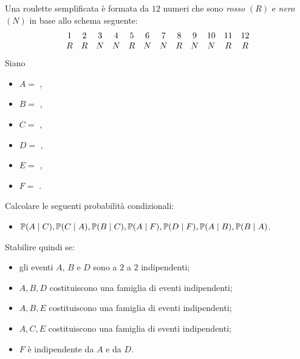 Una roulette semplificata è formata da $12$ numeri che sono \emph{rosso} $(R)$ e \emph{nero} $(N)$ in base allo schema seguente:
\begin{equation*}
	\begin{array}{ c c c c c c c c c c c c }
		1 & 2 & 3 & 4 & 5 & 6 & 7 & 8 & 9 & 10 & 11 & 12\\
		R & R & N & N & R & N & N & R & N & N  & R  & R
	\end{array}
\end{equation*}
Siano
\begin{itemize}
	\item $A=$ ,
	\item $B=$ ,
	\item $C=$ ,
	\item $D=$ ,
	\item $E=$ ,
	\item $F=$ .
\end{itemize}
Calcolare le seguenti probabilità condizionali:
\begin{itemize}
	\item $\mathbb{P}(A\mid C) ,\mathbb{P}(C\mid A) ,\mathbb{P}(B\mid C) ,\mathbb{P}(A\mid F) ,\mathbb{P}(D\mid F) ,\mathbb{P}(A\mid B) ,\mathbb{P}(B\mid A)$.
\end{itemize}
Stabilire quindi se:
\begin{itemize}
	\item gli eventi $A$, $B$ e $D$ sono a $2$ a $2$ indipendenti;
	\item $A,B,D$ costituiscono una famiglia di eventi indipendenti;
	\item $A,B,E$ costituiscono una famiglia di eventi indipendenti;
	\item $A,C,E$ costituiscono una famiglia di eventi indipendenti;
	\item $F$ è indipendente da $A$ e da $D$.
\end{itemize}

\Esercizio{}

